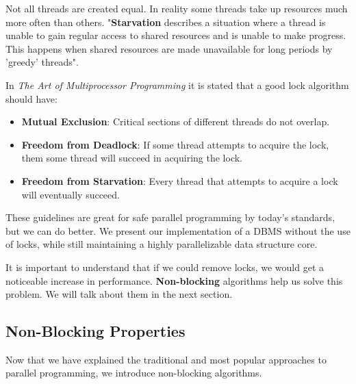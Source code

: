 \documentclass[letterpaper, 11pt]{article}
\begin{document}
Not all threads are created equal. In reality some threads take up resources much more often than others.
"{\bfseries Starvation} describes a situation where a thread is unable to gain regular access
to shared resources and is unable to make progress. This happens when shared resources are
made unavailable for long periods by 'greedy' threads"\citep{oracleconcurrency}.

\par\vspace{\baselineskip}

In \textit{The Art of Multiprocessor Programming}\citep{artofmulti} it is stated that a good lock algorithm should have:

\begin{itemize}
	\item {\bfseries Mutual Exclusion}: Critical sections of different threads do not overlap.
	\item {\bfseries Freedom from Deadlock}: If some thread attempts to acquire the lock, them some thread will succeed in acquiring the lock.
	\item {\bfseries Freedom from Starvation}: Every thread that attempts to acquire a lock will eventually succeed.
\end{itemize}

These guidelines are great for safe parallel programming by today's standards, but we can do better.
We present our implementation of a DBMS without the use of locks, while still maintaining a highly 
parallelizable data structure core.
\par\vspace{\baselineskip}

It is important to understand that if we could remove locks, we would get a noticeable increase in performance.
{\bfseries Non-blocking} algorithms help us solve this problem. We will talk about them in the next section.

\subsection{Non-Blocking Properties}

Now that we have explained the traditional and most popular approaches to parallel programming, we introduce non-blocking algorithms.
\end{document}
